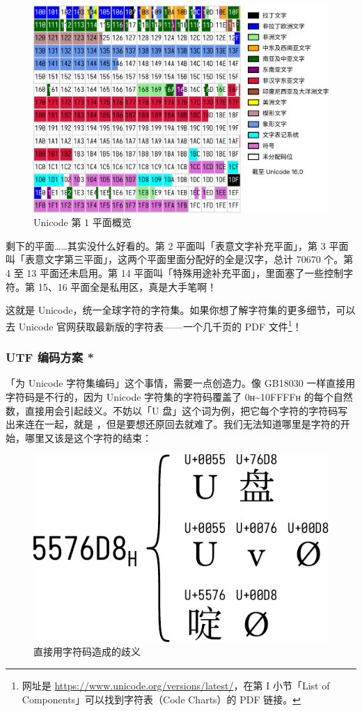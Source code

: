 \begin{figure}[htb!]
  \centering
  \includegraphics[width=.7\textwidth]{assets/advanced/UnicodeSMP.pdf}
  \caption{Unicode 第 1 平面概览}
  \label{fig:UnicodeSMP}
\end{figure}

剩下的平面……其实没什么好看的。第 2 平面叫「表意文字补充平面」，第 3 平面叫「表意文字第三平面」，这两个平面里面分配好的全是汉字，总计 70670 个。第 4 至 13 平面还未启用。第 14 平面叫「特殊用途补充平面」，里面塞了一些控制字符。第 15、16 平面全是私用区，真是大手笔啊！

这就是 Unicode，统一全球字符的字符集。如果你想了解字符集的更多细节，可以去 Unicode 官网获取最新版的字符表——一个几千页的 PDF 文件\footnote{网址是 \url{https://www.unicode.org/versions/latest/}，在第 I 小节「List of Components」可以找到字符表（Code Charts）的 PDF 链接。}！

\subsubsection{UTF 编码方案 *}

「为 Unicode 字符集编码」这个事情，需要一点创造力。像 GB18030 一样直接用字符码是不行的，因为 Unicode 字符集的字符码覆盖了 0ʜ\textasciitilde10FFFFʜ 的每个自然数，直接用会引起歧义。不妨以「U 盘」这个词为例，把它每个字符的字符码写出来连在一起，就是 ，但是要想还原回去就难了。我们无法知道哪里是字符的开始，哪里又该是这个字符的结束：

\begin{figure}[htb!]
  \centering
  \includegraphics[width=.45\textwidth]{assets/advanced/UnicodeEncoding.pdf}
  \caption{直接用字符码造成的歧义}
  \label{fig:UnicodeEncoding}
\end{figure}

